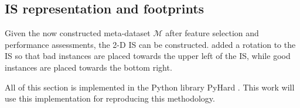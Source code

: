 \subsection{IS representation and footprints}

Given the now constructed meta-dataset $\mathcal{M}$ after feature selection and performance assessments, the 2-D IS can be constructed. \cite{Lorena2022} added a rotation to the IS so that bad instances are placed towards the upper left of the IS, while good instances are placed towards the bottom right.

All of this section is implemented in the Python library PyHard \cite{Lorena2022}. This work will use this implementation for reproducing this methodology.